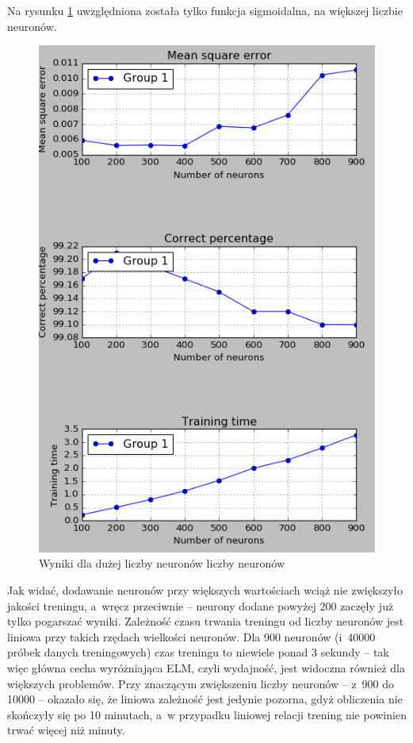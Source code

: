 \documentclass{article}
\begin{document}
Na rysunku \ref{wyniki_dota2_python_performance} uwzględniona została tylko funkcja sigmoidalna, na większej liczbie neuronów.
\begin{figure}[H]
\centering
\includegraphics[width=\textwidth]{wyniki_dota2_python_performance.png}
\caption{Wyniki dla dużej liczby neuronów liczby neuronów}
\label{wyniki_dota2_python_performance}
\end{figure}
Jak widać, dodawanie neuronów przy większych wartościach wciąż nie zwiększyło jakości treningu, a~wręcz przeciwnie -- neurony dodane powyżej 200 zaczęły już tylko pogarszać wyniki. Zależność czasu trwania treningu od liczby neuronów jest liniowa przy takich rzędach wielkości neuronów. Dla 900 neuronów (i~40000 próbek danych treningowych) czas treningu to niewiele ponad 3 sekundy -- tak więc główna cecha wyróżniająca ELM, czyli wydajność, jest widoczna również dla większych problemów. Przy znaczącym zwiększeniu liczby neuronów -- z~900 do 10000 -- okazało się, że liniowa zależność jest jedynie pozorna, gdyż obliczenia nie skończyły się po 10 minutach, a~w przypadku liniowej relacji trening nie powinien trwać więcej niż minuty.
\label{10000_dota2}
\end{document}
